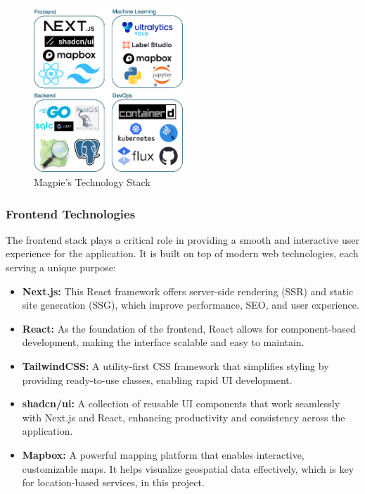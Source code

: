 \begin{figure}[htbp]
    \centering{}
    \includegraphics[width=0.5\textwidth]{images/stack_grid.png}
    \caption{Magpie's Technology Stack}
\end{figure}

\subsubsection{Frontend Technologies}

The frontend stack plays a critical role in providing a smooth and interactive
user experience for the application. It is built on top of modern web
technologies, each serving a unique purpose:

\begin{itemize}
    \item{} \textbf{Next.js:} This React framework offers server{-}side rendering (SSR) and static site generation (SSG), which improve performance, SEO, and user experience.
    \item{} \textbf{React:} As the foundation of the frontend, React allows for component{-}based development, making the interface scalable and easy to maintain.
    \item{} \textbf{TailwindCSS:} A utility{-}first CSS framework that simplifies styling by providing ready{-}to{-}use classes, enabling rapid UI development.
    \item{} \textbf{shadcn/ui:} A collection of reusable UI components that work seamlessly with Next.js and React, enhancing productivity and consistency across the application.
    \item{} \textbf{Mapbox:} A powerful mapping platform that enables interactive, customizable maps. It helps visualize geospatial data effectively, which is key for location{-}based services, in this project.
\end{itemize}

